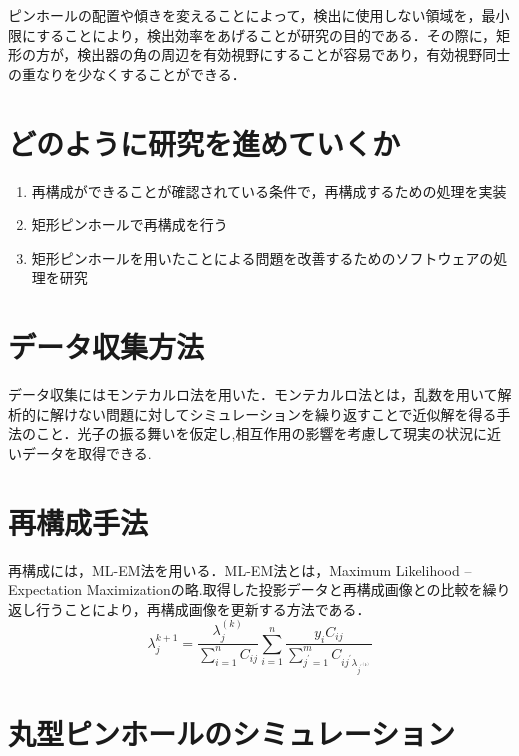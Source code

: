 \documentclass[dvipdfmx,autodetect-engine,twocolumn,10pt]{jsarticle}%
\begin{document}
\newpage
ピンホールの配置や傾きを変えることによって，検出に使用しない領域を，最小限にすることにより，検出効率をあげることが研究の目的である．その際に，矩形の方が，検出器の角の周辺を有効視野にすることが容易であり，有効視野同士の重なりを少なくすることができる．

\section{どのように研究を進めていくか}
\begin{enumerate}
  \item 再構成ができることが確認されている条件で，再構成するための処理を実装
  \item 矩形ピンホールで再構成を行う
  \item 矩形ピンホールを用いたことによる問題を改善するためのソフトウェアの処理を研究

\end{enumerate}

\section{データ収集方法}
データ収集にはモンテカルロ法を用いた．モンテカルロ法とは，乱数を用いて解析的に解けない問題に対してシミュレーションを繰り返すことで近似解を得る手法のこと．光子の振る舞いを仮定し,相互作用の影響を考慮して現実の状況に近いデータを取得できる.



\section{再構成手法}
再構成には，ML-EM法を用いる．ML-EM法とは，Maximum Likelihood – Expectation Maximizationの略.取得した投影データと再構成画像との比較を繰り返し行うことにより，再構成画像を更新する方法である．
\[
  \lambda_j^{k+1}=\frac{\lambda_j^{(k)}}{\sum_{i=1}^{n} C_{ij}}\sum_{i=1}^{n} \frac{y_iC_{ij}}{\sum_{j^{\prime}=1}^{m}C_{ij^{\prime}\lambda_{j^{\prime}^{(k)}}}}
\]


\section{丸型ピンホールのシミュレーション}
\end{document}
